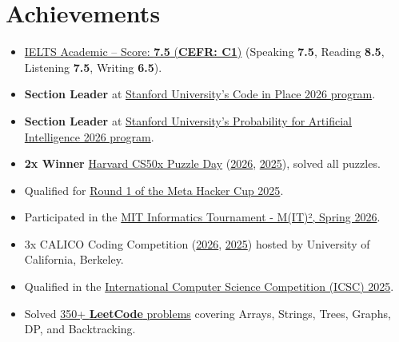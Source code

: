 \documentclass[a4paper,12pt]{article}
\begin{document}
\section{Achievements}
\begin{itemize}
    \item \href{https://drive.google.com/file/d/1uHFju1PVdf3HQKPWlZkGIML0tiujyYCi/view?usp=sharing}{IELTS Academic -- Score: \textbf{7.5} (\textbf{CEFR: C1})} (Speaking \textbf{7.5}, Reading \textbf{8.5}, Listening \textbf{7.5}, Writing \textbf{6.5}).
    \item \textbf{Section Leader} at \href{https://digitalcredential.stanford.edu/check/D9A639D9A14590231C0AF1005115AE2177EF26A78AA7B8B729276CA1D132D88CRUdjenU3RW53UGFMSk4yTDBNc2ZpVFRSWjJZUzZ0REhHZkFXeFNEL1lqRDBUbzRK}{Stanford University's Code in Place 2026 program}.
    \item \textbf{Section Leader} at \href{https://lnkd.in/p/dqT9Sj5b}{Stanford University's Probability for Artificial Intelligence 2026 program}.
    \item \textbf{2x Winner} \href{https://www.linkedin.com/posts/aahmedfaraz_harvard-cs50x-puzzle-day-2026-and-2025-activity-7449007675712991232-2kPr?utm_source=share&utm_medium=member_desktop&rcm=ACoAADdJH-cBzPnm9JIV3RhrpK_TvX28bFX_rEY}{Harvard CS50x Puzzle Day} (\href{https://certificates.cs50.io/569c04c2-3b46-418e-96d8-5603e41f21e5.pdf?size=letter}{2026}, \href{https://certificates.cs50.io/5ed8854f-112a-4bbb-bb85-108d92f3233b.pdf?size=letter}{2025}), solved all puzzles.
    \item Qualified for \href{https://www.facebook.com/codingcompetitions/hacker-cup/2025/certificate/1142880171157242}{Round 1 of the Meta Hacker Cup 2025}.
    \item Participated in the \href{https://www.linkedin.com/posts/aahmedfaraz_mitit-competitiveprogramming-learningexperience-activity-7439049595705524225-wVv6?utm_source=share&utm_medium=member_desktop&rcm=ACoAADdJH-cBzPnm9JIV3RhrpK_TvX28bFX_rEY}{MIT Informatics Tournament - M(IT)², Spring 2026}.
    \item 3x CALICO Coding Competition (\href{https://www.linkedin.com/posts/aahmedfaraz_calico-ucberkeley-competitiveprogramming-share-7455164168938303488-5pVh/?utm_source=share&utm_medium=member_desktop&rcm=ACoAADdJH-cBzPnm9JIV3RhrpK_TvX28bFX_rEY}{2026}, \href{https://www.linkedin.com/posts/aahmedfaraz_calico-pakistan-competitions-activity-7406601213594705920-Ul_x?utm_source=share&utm_medium=member_desktop&rcm=ACoAADdJH-cBzPnm9JIV3RhrpK_TvX28bFX_rEY}{2025}) hosted by University of California, Berkeley.
    \item Qualified in the \href{https://icscompetition.org/c/Certificate-QR-2025-FFB74B80AA6-94ee910f6d161e712e70cca319d93761.pdf}{International Computer Science Competition (ICSC) 2025}.
    \item Solved \href{https://leetcode.com/u/aahmedfaraz/}{350+ \textbf{LeetCode} problems} covering Arrays, Strings, Trees, Graphs, DP, and Backtracking.
\end{itemize}
\end{document}
